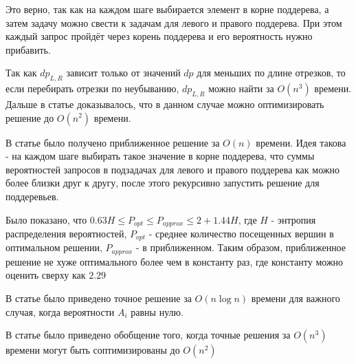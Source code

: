Это верно, так как на каждом шаге выбирается элемент в корне поддерева, а затем задачу можно свести к задачам для левого и правого поддерева. При этом каждый запрос пройдёт через корень поддерева и его вероятность нужно прибавить.
  
Так как $dp_{L, R}$ зависит только от значений $dp$ для меньших по длине отрезков, то если перебирать отрезки по неубыванию, $dp_{L, R}$ можно найти за $O(n^3)$ времени. Дальше в статье доказывалось, что в данном случае можно оптимизировать решение до $O(n^2)$ времени.

В статье \cite{mehlhorn1975} было получено приближенное решение за $O(n)$ времени. Идея такова - на каждом шаге выбирать такое значение в корне поддерева, что суммы вероятностей запросов в подзадачах для левого и правого поддерева как можно более близки друг к другу, после этого рекурсивно запустить решение для поддеревьев.

Было показано, что $0.63H \leqslant P_{opt} \leqslant P_{approx} \leqslant 2 + 1.44H$, где $H$ - энтропия распределения вероятностей, $P_{opt}$ - среднее количество посещенных вершин в оптимальном решении, $P_{approx}$ - в приближенном. Таким образом, приближенное решение не хуже оптимального более чем в константу раз, где константу можно оценить сверху как $2.29$

В статье \cite{garsia1977} было приведено точное решение за $O(n \log n)$ времени для важного случая, когда вероятности $A_i$ равны нулю.

В статье \cite{yao1980} было приведено обобщение того, когда точные решения за $O(n^3)$ времени могут быть соптимизированы до $O(n^2)$